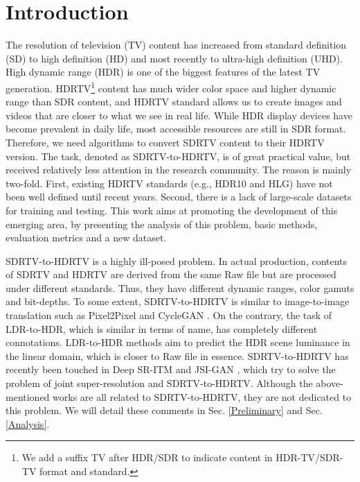 \documentclass[10pt,twocolumn,letterpaper]{article}
\begin{document}
\section{Introduction}
The resolution of television (TV) content has increased from standard definition (SD) to high definition (HD) and most recently to ultra-high definition (UHD). High dynamic range (HDR) is one of the biggest features of the latest TV generation. HDRTV\footnote{We add a suffix TV after HDR/SDR to indicate content in HDR-TV/SDR-TV format and standard.} content has much wider color space and higher dynamic range than SDR content, and HDRTV standard allows us to create images and videos that are closer to what we see in real life. While HDR display devices have become prevalent in daily life, most accessible resources are still in SDR format. Therefore, we need algorithms to convert SDRTV content to their HDRTV version. The task, denoted as SDRTV-to-HDRTV, is of great practical value, but received relatively less attention in the research community. The reason is mainly two-fold. First, existing HDRTV standards (e.g., HDR10 and HLG) have not been well defined until recent years. Second, there is a lack of large-scale datasets for training and testing. This work aims at promoting the development of this emerging area, by presenting the analysis of this problem, basic methods, evaluation metrics and a new dataset. 

SDRTV-to-HDRTV is a highly ill-posed problem. In actual production, contents of SDRTV and HDRTV are derived from the same Raw file but are processed under different standards. Thus, they have different dynamic ranges, color gamuts and bit-depths. To some extent, SDRTV-to-HDRTV is similar to image-to-image translation such as Pixel2Pixel \cite{isola2017image} and CycleGAN \cite{zhu2017unpaired}. On the contrary, the task of LDR-to-HDR, which is similar in terms of name, has completely different connotations. LDR-to-HDR methods \cite{kovaleski2014high, masia2009evaluation, huo2014physiological, liu2020single, eilertsen2017hdr} aim to predict the HDR scene luminance in the linear domain, which is closer to Raw file in essence. SDRTV-to-HDRTV has recently been touched in Deep SR-ITM \cite{kim2019deep} and JSI-GAN \cite{kim2020jsi}, which try to solve the problem of joint super-resolution and SDRTV-to-HDRTV. Although the above-mentioned works are all related to SDRTV-to-HDRTV, they are not dedicated to this problem. We will detail these comments in Sec. \ref{Preliminary} and Sec. \ref{Analysis}.
\end{document}
